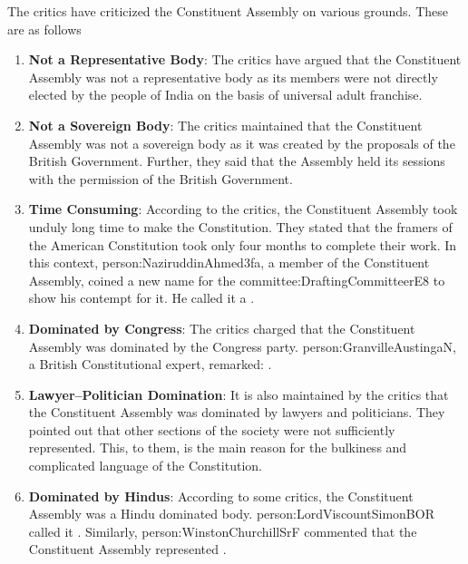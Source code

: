 The critics have criticized the Constituent Assembly on various grounds. These are as follows

\begin{enumerate}
  \item \textbf{Not a Representative Body}: The critics have argued that the Constituent  Assembly was not a representative body as its members were not directly elected by the people of India on the basis of universal adult franchise.
  \item \textbf{Not a Sovereign Body}: The critics maintained that the Constituent Assembly was not a sovereign body as it was created by the proposals of the British Government. Further, they said that the Assembly held its sessions with the permission of the British Government.
  \item \textbf{Time Consuming}: According to the critics, the Constituent Assembly took unduly long time to make the Constitution. They stated that the framers of the American Constitution took only four months to complete their work. In this context, \gls{person:NaziruddinAhmed3fa}, a member of the Constituent Assembly, coined a new name for the \gls{committee:DraftingCommitteerE8} to show his contempt for it. He called it a .
  \item \textbf{Dominated by Congress}: The critics charged that the Constituent Assembly was dominated by the Congress party. \gls{person:GranvilleAustingaN}, a British Constitutional expert, remarked: .
  \item \textbf{Lawyer–Politician Domination}: It is also maintained by the critics that the Constituent Assembly was dominated by lawyers and politicians. They pointed out that other sections of the society were not sufficiently represented. This, to them, is the main reason for the bulkiness and complicated language of the Constitution.
  \item \textbf{Dominated by Hindus}: According to some critics, the Constituent Assembly was a Hindu dominated body. \gls{person:LordViscountSimonBOR} called it . Similarly, \gls{person:WinstonChurchillSrF} commented that the Constituent Assembly represented .
\end{enumerate}



